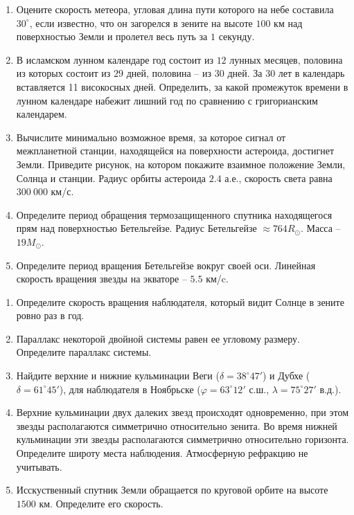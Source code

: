 \documentclass[11pt]{article}
\begin{document}
\begin{enumerate}[label=\textbf{D\arabic*.}]
	\item Оцените скорость метеора, угловая длина пути которого на небе составила $30^{\circ}$, если известно, что он загорелся в зените на высоте $100$ км над поверхностью Земли и пролетел весь путь за $1$ секунду. %
    \item В исламском лунном календаре год состоит из $12$ лунных месяцев, половина из которых состоит из $29$ дней, половина -- из $30$ дней. За $30$ лет в календарь вставляется 11 високосных дней. Определить, за какой промежуток времени в лунном календаре набежит лишний год по сравнению с григорианским календарем. %
    \item Вычислите минимально возможное время, за которое сигнал от межпланетной станции, находящейся на поверхности астероида, достигнет Земли. Приведите рисунок, на котором покажите взаимное положение Земли, Солнца и станции. Радиус орбиты астероида $2.4$ а.е., скорость света равна $300~000$ км/с.
    \item Определите период обращения термозащищенного спутника находящегося прям над поверхностью Бетельгейзе. Радиус Бетельгейзе $\approx 764 R_{\odot}$. Масса -- $19 M_{\odot}$. %
    \item Определите период вращения Бетельгейзе вокруг своей оси. Линейная скорость вращения звезды на экваторе -- $5.5$ км/c. %
\end{enumerate}

\begin{enumerate}[label=\textbf{E\arabic*.}]
	\item Определите скорость вращения наблюдателя, который видит Солнце в зените ровно раз в год. %
    \item Параллакс некоторой двойной системы равен ее угловому размеру. Определите параллакс системы. %
    \item Найдите верхние и нижние кульминации Веги ($\delta = 38^{\circ} 47'$) и Дубхе ($\delta =  61^{\circ} 45'$), для наблюдателя в Ноябрьске ($\varphi = 63^{\circ} 12'$ с.ш., $ \lambda = 75^{\circ} 27'$ в.д.).
    \item Верхние кульминации двух далеких звезд происходят одновременно, при этом звезды располагаются симметрично относительно зенита. Во время нижней кульминации эти звезды располагаются симметрично относительно горизонта. Определите широту места наблюдения. Атмосферную рефракцию не учитывать. %
    \item Исскуственный спутник Земли обращается по круговой орбите на высоте $1500$ км. Определите его скорость. %
\end{enumerate}
\end{document}
